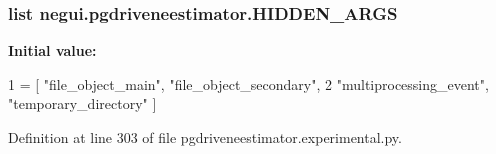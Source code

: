 \subsubsection[{\texorpdfstring{H\+I\+D\+D\+E\+N\+\_\+\+A\+R\+GS}{HIDDEN_ARGS}}]{\setlength{\rightskip}{0pt plus 5cm}list negui.\+pgdriveneestimator.\+H\+I\+D\+D\+E\+N\+\_\+\+A\+R\+GS}\hypertarget{namespacenegui_1_1pgdriveneestimator_a45abba7d5f3257469b6cbfd7392eba09}{}\label{namespacenegui_1_1pgdriveneestimator_a45abba7d5f3257469b6cbfd7392eba09}
{\bfseries Initial value\+:}
\begin{DoxyCode}
1 = [ \textcolor{stringliteral}{"file\_object\_main"}, \textcolor{stringliteral}{"file\_object\_secondary"}, 
2                     \textcolor{stringliteral}{"multiprocessing\_event"}, \textcolor{stringliteral}{"temporary\_directory"}  ]
\end{DoxyCode}


Definition at line 303 of file pgdriveneestimator.\+experimental.\+py.

